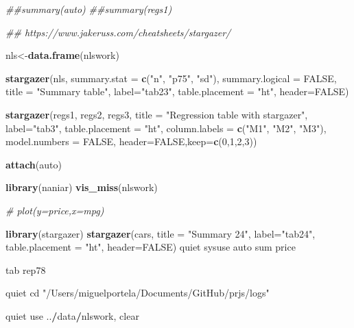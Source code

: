 \documentclass[
  12pt,
]{article}
\newenvironment{Shaded}{\begin{snugshade}}{\end{snugshade}}
\newcommand{\CommentTok}[1]{\textcolor[rgb]{0.56,0.35,0.01}{\textit{#1}}}
\newcommand{\DataTypeTok}[1]{\textcolor[rgb]{0.13,0.29,0.53}{#1}}
\newcommand{\DecValTok}[1]{\textcolor[rgb]{0.00,0.00,0.81}{#1}}
\newcommand{\KeywordTok}[1]{\textcolor[rgb]{0.13,0.29,0.53}{\textbf{#1}}}
\newcommand{\NormalTok}[1]{#1}
\newcommand{\OperatorTok}[1]{\textcolor[rgb]{0.81,0.36,0.00}{\textbf{#1}}}
\newcommand{\OtherTok}[1]{\textcolor[rgb]{0.56,0.35,0.01}{#1}}
\newcommand{\StringTok}[1]{\textcolor[rgb]{0.31,0.60,0.02}{#1}}
\begin{document}
\begin{Shaded}
\begin{Highlighting}[]
{\CommentTok{##summary(auto)}
\CommentTok{##summary(regs1)}

\CommentTok{## https://www.jakeruss.com/cheatsheets/stargazer/}

\NormalTok{nls<-}\KeywordTok{data.frame}\NormalTok{(nlswork)}

\KeywordTok{stargazer}\NormalTok{(nls, }\DataTypeTok{summary.stat =} \KeywordTok{c}\NormalTok{(}\StringTok{"n"}\NormalTok{, }\StringTok{"p75"}\NormalTok{, }\StringTok{"sd"}\NormalTok{), }\DataTypeTok{summary.logical =} \OtherTok{FALSE}\NormalTok{,}
          \DataTypeTok{title =} \StringTok{"Summary table"}\NormalTok{,}
          \DataTypeTok{label=}\StringTok{"tab23"}\NormalTok{,}
          \DataTypeTok{table.placement =} \StringTok{"ht"}\NormalTok{,}
          \DataTypeTok{header=}\OtherTok{FALSE}\NormalTok{)}


\KeywordTok{stargazer}\NormalTok{(regs1, regs2, regs3,}
          \DataTypeTok{title =} \StringTok{"Regression table with stargazer"}\NormalTok{,}
          \DataTypeTok{label=}\StringTok{"tab3"}\NormalTok{,}
          \DataTypeTok{table.placement =} \StringTok{"ht"}\NormalTok{,}
          \DataTypeTok{column.labels =} \KeywordTok{c}\NormalTok{(}\StringTok{"M1"}\NormalTok{, }\StringTok{"M2"}\NormalTok{, }\StringTok{"M3"}\NormalTok{),}
          \DataTypeTok{model.numbers =} \OtherTok{FALSE}\NormalTok{,}
          \DataTypeTok{header=}\OtherTok{FALSE}\NormalTok{,}\DataTypeTok{keep=}\KeywordTok{c}\NormalTok{(}\DecValTok{0}\NormalTok{,}\DecValTok{1}\NormalTok{,}\DecValTok{2}\NormalTok{,}\DecValTok{3}\NormalTok{))}

\KeywordTok{attach}\NormalTok{(auto)}


\KeywordTok{library}\NormalTok{(naniar)}
\KeywordTok{vis_miss}\NormalTok{(nlswork)}

\CommentTok{# plot(y=price,x=mpg)}

\KeywordTok{library}\NormalTok{(stargazer)}
\KeywordTok{stargazer}\NormalTok{(cars,}
          \DataTypeTok{title =} \StringTok{"Summary 24"}\NormalTok{,}
          \DataTypeTok{label=}\StringTok{"tab24"}\NormalTok{,}
          \DataTypeTok{table.placement =} \StringTok{"ht"}\NormalTok{,}
          \DataTypeTok{header=}\OtherTok{FALSE}\NormalTok{)}
\NormalTok{quiet sysuse auto}
\NormalTok{sum price}

\NormalTok{tab rep78}

\NormalTok{quiet cd }\StringTok{"/Users/miguelportela/Documents/GitHub/prjs/logs"}

\NormalTok{quiet use ..}\OperatorTok{/}\NormalTok{data}\OperatorTok{/}\NormalTok{nlswork, clear}

}
\end{Highlighting}
\end{Shaded}
\end{document}
